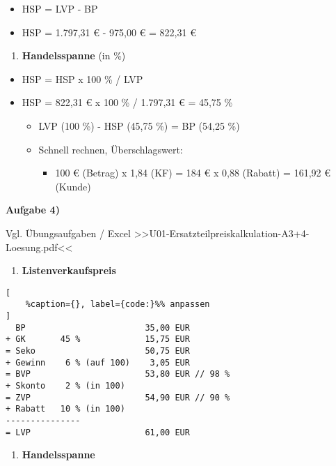 \begin{itemize}
\item
  HSP = LVP - BP
\item
  HSP = 1.797,31 € - 975,00 € = 822,31 €
\end{itemize}

\begin{enumerate}
\def\labelenumi{\alph{enumi})}
\setcounter{enumi}{5}
\item
  \textbf{Handelsspanne} (in \%)
\end{enumerate}

\begin{itemize}
\item
  HSP = HSP x 100 \% / LVP
\item
  HSP = 822,31 € x 100 \% / 1.797,31 € = 45,75 \%

  \begin{itemize}
  \item
    LVP (100 \%) - HSP (45,75 \%) = BP (54,25 \%)
  \item
    Schnell rechnen, Überschlagswert:

    \begin{itemize}
    \item
      100 € (Betrag) x 1,84 (KF) = 184 € x 0,88 (Rabatt) = 161,92 €
      (Kunde)
    \end{itemize}
  \end{itemize}
\end{itemize}

\textbf{Aufgabe 4)}

Vgl. Übungsaufgaben / Excel
>>U01-Ersatzteilpreiskalkulation-A3+4-Loesung.pdf<<

\begin{enumerate}
\def\labelenumi{\alph{enumi})}
\item
  \textbf{Listenverkaufspreis}
\end{enumerate}

\lstset{language=Python}%
\begin{lstlisting}[
	%caption={}, label={code:}%% anpassen
]
  BP                        35,00 EUR
+ GK       45 %             15,75 EUR
= Seko                      50,75 EUR
+ Gewinn    6 % (auf 100)    3,05 EUR
= BVP                       53,80 EUR // 98 %
+ Skonto    2 % (in 100)    
= ZVP                       54,90 EUR // 90 %
+ Rabatt   10 % (in 100)   
--------------- 
= LVP                       61,00 EUR
\end{lstlisting}

\begin{enumerate}
\def\labelenumi{\alph{enumi})}
\setcounter{enumi}{1}
\item
  \textbf{Handelsspanne}
\end{enumerate}

